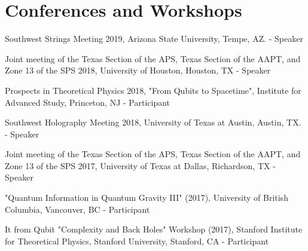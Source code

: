 \documentclass[letterpaper]{article}
\renewenvironment{itemize}{
  \begin{list}{}{
    \setlength{\leftmargin}{1.5em}
  }
}{
  \end{list}
}
\begin{document}
\section*{Conferences and Workshops}
\begin{itemize}

\item Southwest Strings Meeting 2019, Arizona State University, Tempe, AZ. - Speaker

\item Joint meeting of the Texas Section of the APS, Texas Section of the AAPT, and Zone 13 of the SPS 2018, University of Houston, Houston, TX - Speaker

\item Prospects in Theoretical Physics 2018, "From Qubits to Spacetime", Institute for Advanced Study, Princeton, NJ - Participant

\item Southwest Holography Meeting 2018, University of Texas at Austin, Austin, TX. - Speaker

\item Joint meeting of the Texas Section of the APS, Texas Section of the AAPT, and Zone 13 of the SPS 2017, University of Texas at Dallas, Richardson, TX - Speaker

\item "Quantum Information in Quantum Gravity III" (2017), University of British Columbia, Vancouver, BC - Participant

\item It from Qubit "Complexity and Back Holes" Workshop (2017), Stanford Institute for Theoretical Physics, Stanford University, Stanford, CA - Participant

\end{itemize}
\end{document}
